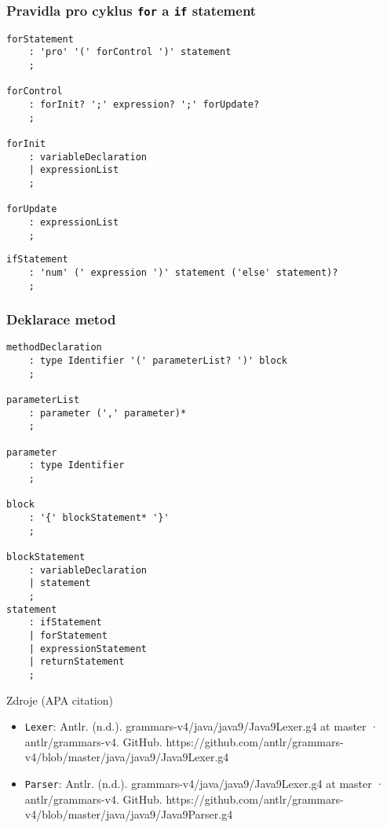 \documentclass[11pt]{beamer}
\begin{document}
\begin{frame}[fragile]
\frametitle{Pravidla pro cyklus \texttt{for} a \texttt{if} statement}
\begin{lstlisting}
forStatement
    : 'pro' '(' forControl ')' statement
    ;

forControl
    : forInit? ';' expression? ';' forUpdate?
    ;

forInit
    : variableDeclaration
    | expressionList
    ;

forUpdate 
    : expressionList
    ;
\end{lstlisting}
\begin{lstlisting}
ifStatement
    : 'num' (' expression ')' statement ('else' statement)?
    ;
\end{lstlisting}
\end{frame}

\begin{frame}[fragile]
\frametitle{Deklarace metod}
\begin{lstlisting}
methodDeclaration
    : type Identifier '(' parameterList? ')' block
    ;

parameterList
    : parameter (',' parameter)*
    ;

parameter
    : type Identifier
    ;

block
    : '{' blockStatement* '}'
    ;

blockStatement
    : variableDeclaration
    | statement
    ;
statement
    : ifStatement
    | forStatement
    | expressionStatement
    | returnStatement
    ;
\end{lstlisting}
\end{frame}
\begin{frame}{Zdroje (APA citation)}
\begin{itemize}
	\item \texttt{Lexer}: Antlr. (n.d.). grammars-v4/java/java9/Java9Lexer.g4 at master · antlr/grammars-v4. GitHub. https://github.com/antlr/grammars-v4/blob/master/java/java9/Java9Lexer.g4
	\item \texttt{Parser}:
	Antlr. (n.d.). grammars-v4/java/java9/Java9Lexer.g4 at master · antlr/grammars-v4. GitHub. https://github.com/antlr/grammars-v4/blob/master/java/java9/Java9Parser.g4
\end{itemize}
\end{frame}
\end{document}
